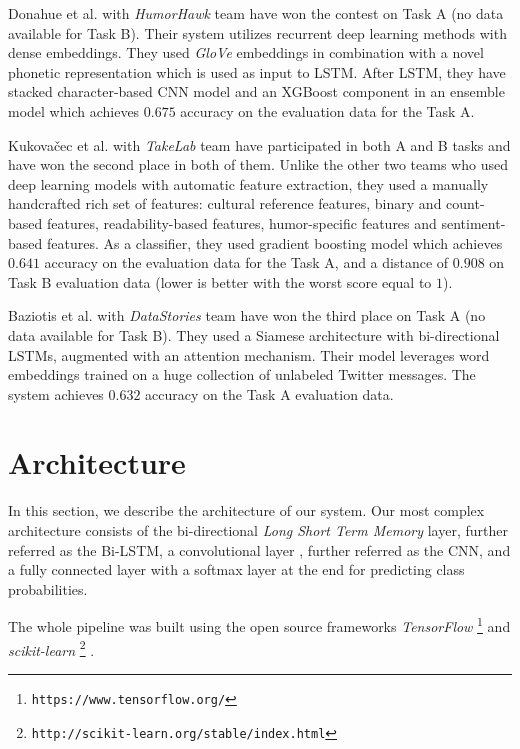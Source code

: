 \documentclass[10pt, a4paper]{article}
\begin{document}
Donahue et al. with \emph{HumorHawk} team have won the contest on Task A 
(no data available for Task B). Their system utilizes recurrent deep learning
methods with dense embeddings. They used \emph{GloVe} embeddings in combination
with a novel phonetic representation which is used as input to LSTM. After LSTM,
they have stacked character-based CNN model and an XGBoost \citep{XGBoost2016}
component in an ensemble model which achieves $0.675$ accuracy on the evaluation data for the Task A.

Kukova\v{c}ec et al. with \emph{TakeLab} team have participated in both A and B tasks
and have won the second place in both of them. Unlike the other two
teams \citep{humorhawk2017,datastories2017} who used deep learning models
with automatic feature extraction, they used a manually handcrafted rich set
of features:  cultural reference features, binary and count-based features,
readability-based features, humor-specific features and sentiment-based features.
As a classifier, they used gradient boosting model which achieves $0.641$ accuracy
on the evaluation data for the Task A, and a distance of $0.908$ on Task B
evaluation data (lower is better with the worst score equal to $1$).

Baziotis et al. with \emph{DataStories} team have won the third place on Task A
(no data available for Task B). They used a Siamese
architecture \citep{siamese1993} with bi-directional LSTMs, augmented with an
attention mechanism. Their model leverages word embeddings trained on a huge collection
of unlabeled Twitter messages. The system achieves $0.632$ accuracy on the Task
A evaluation data.

\section{Architecture}

In this section, we describe the architecture of our system. Our most complex
architecture consists of the bi-directional
\emph{Long Short Term Memory} \citep{lstm1997} layer, further referred as the Bi-LSTM,
a convolutional layer \citep{cnn1998}, further referred as the CNN, and a fully connected
layer with a softmax layer at the end for predicting class probabilities.

The whole pipeline was built using the open source frameworks
\emph{TensorFlow} \footnote{\texttt{https://www.tensorflow.org/}} \citep{tensorflow2015}
and
\emph{scikit-learn} \footnote{\texttt{http://scikit-learn.org/stable/index.html}} \citep{scikit-learn}.
\end{document}
